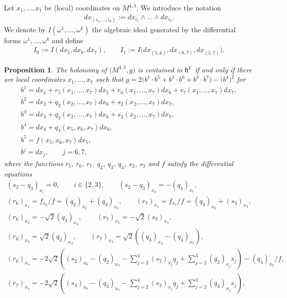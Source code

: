 \documentclass[11pt]{article}
\numberwithin{equation}{section}
\newtheorem{Proposition}[Theorem]{Proposition}
 { \theoremstyle{definition}
\newtheorem{Definition}[Theorem]{Definition}
\newtheorem{Example}[Theorem]{Example}
\newtheorem{Remark}[Theorem]{Remark} }
\newcommand\fh{{\frak h}}
\begin{document}
\begin{Definition}Let $x_1,\dots, x_7$ be (local) coordinates on $M^{4,3}$. We introduce the notation \begin{gather*}dx_{(i_1,\dots,i_k)}:=dx_{i_1}\wedge \dots \wedge dx_{i_k}.\end{gather*}
We denote by $I(\omega^1,\dots, \omega^k)$ the algebraic ideal generated by the differential forms $\omega^1,\dots, \omega^k$ and define \begin{gather*}I_0:=I(dx_5,dx_6,dx_7),\qquad I_1:=I\big(dx_{(5,6)}, dx_{(6,7)}, dx_{(5,7)}\big).\end{gather*}
\end{Definition}

\begin{Proposition}\label{Lg}The holonomy of $\big(M^{4,3},g\big)$ is contained in $\fh^I$ if and only if there are local coordinates $x_1,\dots,x_7$ such that $g=2\big(b^1\cdot b^5+b^2\cdot b^6+b^3\cdot b^7\big)- \big(b^4\big)^2$ for
\begin{gather}
b^1 = dx_1+r_5(x_1,\dots,x_7)dx_5+r_6(x_1,\dots,x_7)dx_6+r_7(x_1,\dots,x_7)dx_7,\label{beg}\\
b^2 =dx_2+ q_2(x_2,\dots,x_7)dx_6+s_2(x_2,\dots,x_7)dx_7,\\
b^3 =dx_3+ q_3(x_2,\dots,x_7)dx_6+s_3(x_2,\dots,x_7)dx_7,\\
b^4 =dx_4+ q_4(x_5,x_6,x_7)dx_6,\\
b^5 =f(x_5,x_6,x_7)dx_5,\\
b^j =dx_j,\qquad j=6,7, \label{end}
\end{gather}
 where the functions $r_5$, $r_6$, $r_7$, $q_2$, $q_3$, $q_4$, $s_2$, $s_3$ and $f$ satisfy the differential equations
\begin{gather}
(s_2-q_3)_{x_i}=0,\qquad i\in\{2,3\},\qquad (s_2-q_3)_{x_4}=-(q_4)_{x_7},\label{Eb1}\\
(r_6)_{x_1}=f_{x_6}/f=(q_2)_{x_2}+(q_3)_{x_3}, \qquad (r_7)_{x_1}=f_{x_7}/f=(q_3)_{x_2}+(s_3)_{x_3},\label{Eb2}\\
(r_6)_{x_2}=-\sqrt{2} (q_3)_{x_4},\qquad \, (r_7)_{x_2}=-\sqrt{2} (s_3)_{x_4},\label{Eb3}\\
(r_6)_{x_3}=\sqrt{2} (q_2)_{x_4},\qquad (r_7)_{x_3}=\sqrt{2} ((q_3)_{x_4}-(q_4)_{x_7}),\label{Eb4}\\
(r_6)_{x_4}= -2\sqrt{2}\left((s_2)_{x_6}-(q_2)_{x_7}-\sum_{j=2}^4(s_2)_{x_j}q_j+\sum_{j=2}^3(q_2)_{x_j}s_j\right)-(q_4)_{x_5}/f ,\label{Eb4a}\\
(r_7)_{x_4}= -2\sqrt{2}\left((s_3)_{x_6}-(q_3)_{x_7}-\sum_{j=2}^4(s_3)_{x_j}q_j+\sum_{j=2}^3(q_3)_{x_j}s_j\right) ,\label{Eb5}\\

\end{gather}
\end{Proposition}
\end{document}
